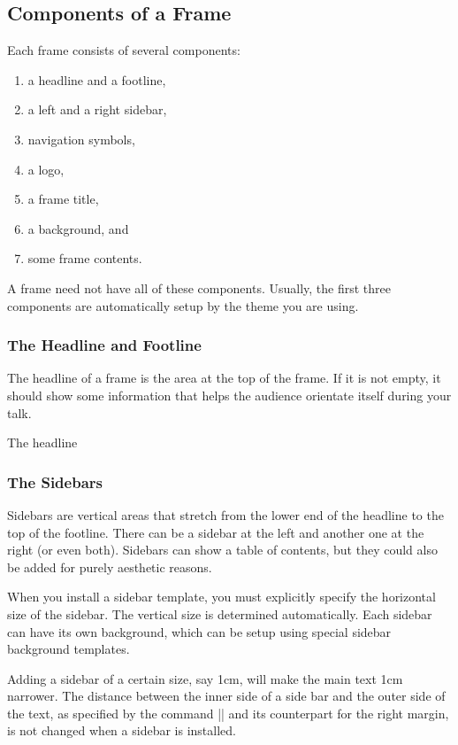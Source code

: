 \subsection{Components of a Frame}

Each frame consists of several components:
\begin{enumerate}\itemsep=0pt\parskip=0pt
\item a headline and a footline,
\item a left and a right sidebar,
\item navigation symbols,
\item a logo,
\item a frame title, 
\item a background, and
\item some frame contents.
\end{enumerate}

A frame need not have all of these components. Usually, the first
three components are automatically setup by the theme you are using. 


\subsubsection{The Headline and Footline}

The headline of a frame is the area at the top of the frame. If it is
not empty, it should show some information that helps the audience
orientate itself during your talk.

The headline 


\subsubsection{The Sidebars}


Sidebars are vertical areas that stretch from the lower end of the
headline to the top of the footline. There can be a sidebar at the
left and another one at the right (or even both). Sidebars can show a
table of contents, but they could also be added for purely aesthetic
reasons.

When you install a sidebar template, you must explicitly specify the
horizontal size of the sidebar. The vertical size is determined
automatically. Each sidebar can have its own background, which can be
setup using special sidebar background templates.

Adding a sidebar of a certain size, say 1cm, will make the main text
1cm narrower. The distance between the inner side of a side
bar and the outer side of the text, as specified by
the command |\beamersetleftmargin| and its counterpart for the
right margin, is not changed when a sidebar is installed.

